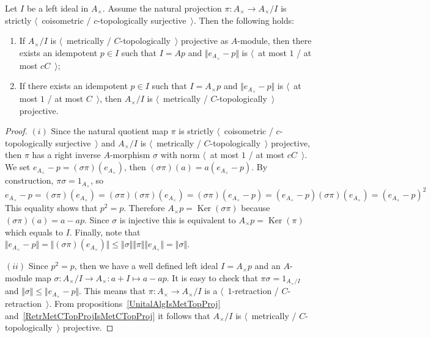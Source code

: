 \begin{proposition}\label{MetTopProjCycModCharac} Let $I$ be a left ideal in
$A_\times $. Assume the natural projection $\pi:A_\times\to A_\times/I$ is
strictly $\langle$~coisometric / $c$-topologically surjective~$\rangle$. 
Then the following holds:

\begin{enumerate}[label = (\roman*)]
    \item If $A_\times /I$ is $\langle$~metrically / $C$-topologically~$\rangle$
    projective as $A$-module, then there exists an idempotent $p\in I$ such that
    $I=Ap$ and $\Vert e_{A_\times}-p\Vert$ is $\langle$~at most $1$ / at most
    $cC$~$\rangle$;

    \item If there exists an idempotent $p\in I$ such that $I=A_\times  p$ and
    $\Vert e_{A_\times }-p\Vert$ is $\langle$~at most $1$ / at most
    $C$~$\rangle$, then $A_\times/I$ is $\langle$~metrically /
    $C$-topologically~$\rangle$ projective.
\end{enumerate}
\end{proposition}
\begin{proof} $(i)$ Since the natural quotient map $\pi$ is strictly 
$\langle$~coisometric / $c$-topologically surjective~$\rangle$ and $A_\times /I$
is $\langle$~metrically / $C$-topologically~$\rangle$ projective, then $\pi$ has
a right inverse $A$-morphism $\sigma$ with norm $\langle$~at most $1$ / at most
$cC$~$\rangle$. We set $e_{A_\times }-p=(\sigma\pi)(e_{A_\times })$, then
$(\sigma\pi)(a)=a(e_{A_\times }-p)$. By construction, $\pi\sigma=1_{A_\times }$,
so  
$$
e_{A_\times }-p
=(\sigma\pi)(e_{A_\times })
=(\sigma\pi)(\sigma\pi)(e_{A_\times })
=(\sigma\pi)(e_{A_\times }-p)
=(e_{A_\times }-p)(\sigma\pi)(e_{A_\times })
={(e_{A_\times }-p)}^2
$$
This equality shows that $p^2=p$. Therefore $A_\times
p=\operatorname{Ker}(\sigma\pi)$ because $(\sigma\pi)(a)=a-ap$. Since $\sigma$
is injective this is equivalent to $A_\times p=\operatorname{Ker}(\pi)$ which
equals to $I$. Finally, note that 
$\Vert e_{A_\times }-p\Vert
=\Vert(\sigma\pi)(e_{A_\times})\Vert
\leq\Vert\sigma\Vert\Vert\pi\Vert\Vert e_{A_\times }\Vert
=\Vert\sigma\Vert$.

$(ii)$ Since $p^2=p$, then we have a well defined left ideal $I=A_\times p$ and
an $A$-module map $\sigma:A_\times /I\to A_\times:a+I\mapsto a-ap$. It is easy
to check that $\pi\sigma=1_{A_\times/I}$ 
and $\Vert\sigma\Vert\leq\Vert e_{A_\times }-p\Vert$. 
This means that $\pi:A_\times \to A_\times /I$ is a
$\langle$~$1$-retraction / $C$-retraction~$\rangle$. From
propositions~\ref{UnitalAlgIsMetTopProj} 
and~\ref{RetrMetCTopProjIsMetCTopProj} it follows that $A_\times /I$ is
$\langle$~metrically / $C$-topologically~$\rangle$ projective.
\end{proof} 

